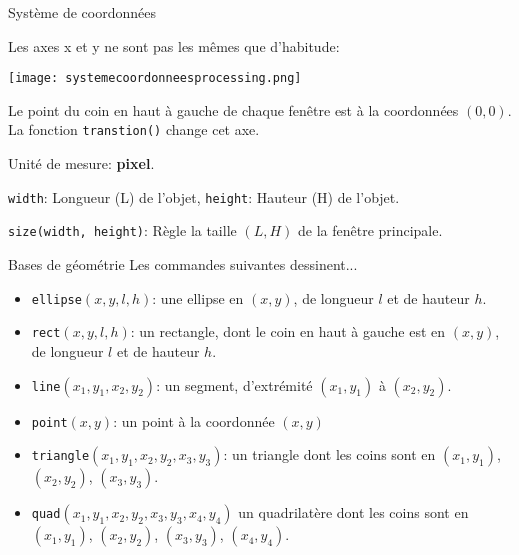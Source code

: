 \documentclass[a4paper, 8pt]{article}
\theoremstyle{definition}
\begin{document}
\begin{bclogo}[logo = \bccrayon, arrondi = 0.1, noborder = true]{\textcolor{redStruc}{Système de coordonnées}}
\begin{itemize}[font= \color{redStruc} \small , label = \textbullet ]
\item Les axes x et y ne sont pas les mêmes que d'habitude: ~\\\begin{minipage}[l]{.6\linewidth}
\texttt{[image: systemecoordonneesprocessing.png]}
\end{minipage}
\begin{minipage}[r]{.3\linewidth}
\item Le point du coin en haut à gauche de chaque fenêtre est à la coordonnées $(0,0)$.  La fonction \texttt{transtion()} change cet axe.\\
\item Unité de mesure: \textbf{pixel}.
\end{minipage}
\item \texttt{width}: Longueur (L) de l'objet, \textcolor{redStruc}{\small \textbullet} \texttt{height}: Hauteur (H) de l'objet.
\item \texttt{size(width, height)}: Règle la taille $(L, H)$ de la fenêtre principale.

\end{itemize}
\end{bclogo}




\begin{bclogo}[logo = \bccrayon, arrondi = 0.1, noborder = true]{\textcolor{redStruc}{Bases de géométrie}}
Les commandes suivantes dessinent...
\begin{itemize}[font= \color{redStruc} \small , label = \textbullet ]
\item \texttt{ellipse$(x,y,l,h)$}: une ellipse en $(x,y)$, de longueur $l$ et de hauteur $h$.
\item \texttt{rect$(x,y,l,h)$}: un rectangle, dont le coin en haut à gauche est en $(x,y)$, de longueur $l$ et de hauteur $h$.
\item \texttt{line$(x_1,y_1,x_2,y_2)$}: un segment, d'extrémité $(x_1,y_1)$ à $(x_2,y_2)$.
\item \texttt{point$(x,y)$}: un point à la coordonnée $\left(x,y\right)$
\item \texttt{triangle$(x_1,y_1,x_2,y_2,x_3,y_3)$}: un triangle dont les coins sont en $(x_1,y_1)$, $(x_2,y_2)$, $(x_3,y_3)$.
\item \texttt{quad$(x_1,y_1,x_2,y_2,x_3,y_3,x_4,y_4)$} un quadrilatère dont les coins sont en $(x_1,y_1)$, $(x_2,y_2)$, $(x_3,y_3)$, $\left( x_4, y_4 \right)$.
\end{itemize} 
\end{bclogo}
\end{document}
